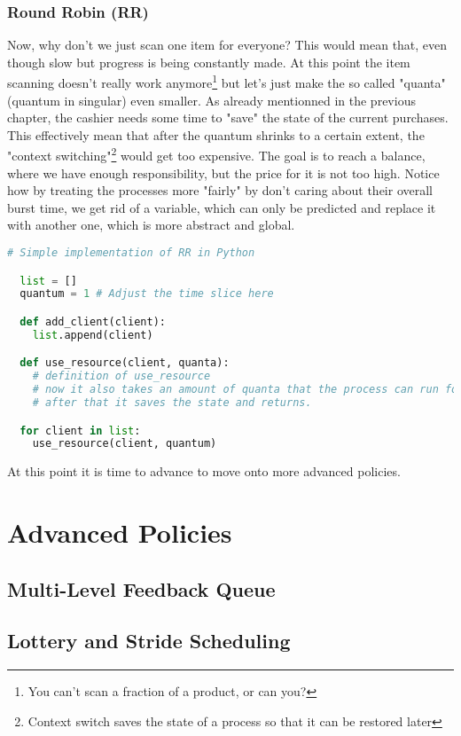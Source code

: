 \documentclass{report}
\newcounter{defi}[section]\setcounter{defi}{0}
\begin{document}
\section{Round Robin (RR)}

Now, why don't we just scan one item for everyone? 
This would mean that, even though slow but progress is being constantly made.
At this point the item scanning doesn't really work anymore\footnote{You can't scan a fraction of a product, or can you?} but let's just make the so called "quanta" (quantum in singular) even smaller.
As already mentionned in the previous chapter, the cashier needs some time to "save" the state of the current purchases. 
This effectively mean that after the quantum shrinks to a certain extent, the "context switching"\footnote{Context switch saves the state of a process so that it can be restored later} would get too expensive. 
The goal is to reach a balance, where we have enough responsibility, but the price for it is not too high.
Notice how by treating the processes more "fairly" by don't caring about their overall burst time, we get rid of a variable, which can only be predicted and replace it with another one, which is more abstract and global.
\pagebreak
\begin{lstlisting}[language=Python, style=colorEX]
  # Simple implementation of RR in Python

  list = []
  quantum = 1 # Adjust the time slice here

  def add_client(client):
    list.append(client)

  def use_resource(client, quanta):
    # definition of use_resource
    # now it also takes an amount of quanta that the process can run for
    # after that it saves the state and returns.

  for client in list:
    use_resource(client, quantum)

\end{lstlisting}

At this point it is time to advance to move onto more advanced policies.

\part{Advanced Policies}

\chapter{Multi-Level Feedback Queue}

\chapter{Lottery and Stride Scheduling}
\end{document}
